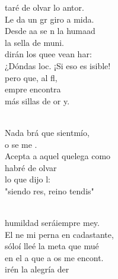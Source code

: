 \documentclass[12pt]{article}
\begin{document}
\begin{multicols*}{2}
\begin{cancion}%
	taré de olvar lo antor.\\
	Le da un gr giro a mida.\\
	Desde aa se n la humaad\\
	la sella de muni.\\
\jump
	dirán los quee vean har:\\
	¿Dóndas loc. ¡Si eso es isible!\\
	pero  que, al fl, \\
	empre encontra \\
	más sillas de or y.\\\jump\\
	\begin{chorus}%
	Nada brá que sientmío,\\
	o se me .\\
	Acepta a aquel quelega como  \\
	 habré de olvar  \\
	lo que dijo l:\\
	"siendo res,  reino tendis"\\
	\end{chorus}%
	\jump\\
	humildad seráiempre mey.\\
	El ne mi perna en cadastante,\\
	sóloí lleé la meta que mué \\
	en el a que a os me encont. \\
\jump
	irén la alegría der  \\

\end{cancion}
\end{multicols*}
\end{document}
